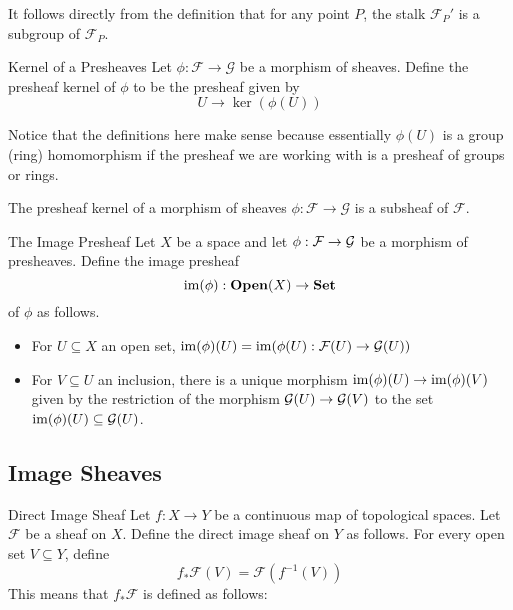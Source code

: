 \documentclass[a4paper]{article}
\begin{document}
It follows directly from the definition that for any point $P$, the stalk $\mathcal{F}_P'$ is a subgroup of $\mathcal{F}_P$. 

\begin{defn}{Kernel of a Presheaves}{} Let $\phi:\mathcal{F}\to\mathcal{G}$ be a morphism of sheaves. Define the presheaf kernel of $\phi$ to be the presheaf given by $$U\to\ker(\phi(U))$$ 
\end{defn}

Notice that the definitions here make sense because essentially $\phi(U)$ is a group (ring) homomorphism if the presheaf we are working with is a presheaf of groups or rings. 

\begin{prp}{}{} The presheaf kernel of a morphism of sheaves $\phi:\mathcal{F}\to\mathcal{G}$ is a subsheaf of $\mathcal{F}$. 
\end{prp}

\begin{defn}{The Image Presheaf}{} Let $X$ be a space and let $\phi:\mathcal{F}\to\mathcal{G}$ be a morphism of presheaves. Define the image presheaf $$\operatorname{im}(\phi):\bold{Open}(X)\to\bold{Set}$$ of $\phi$ as follows. 
\begin{itemize}
\item For $U\subseteq X$ an open set, $\operatorname{im}(\phi)(U)=\operatorname{im}(\phi(U):\mathcal{F}(U)\to\mathcal{G}(U))$
\item For $V\subseteq U$ an inclusion, there is a unique morphism $\operatorname{im}(\phi)(U)\to\operatorname{im}(\phi)(V)$ given by the restriction of the morphism $\mathcal{G}(U)\to\mathcal{G}(V)$ to the set $\operatorname{im}(\phi)(U)\subseteq\mathcal{G}(U)$. 
\end{itemize}
\end{defn}

\subsection{Image Sheaves}
\begin{defn}{Direct Image Sheaf}{} Let $f:X\to Y$ be a continuous map of topological spaces. Let $\mathcal{F}$ be a sheaf on $X$. Define the direct image sheaf on $Y$ as follows. For every open set $V\subseteq Y$, define $$f_\ast\mathcal{F}(V)=\mathcal{F}(f^{-1}(V))$$ This means that $f_\ast\mathcal{F}$ is defined as follows: \\~\\
\end{defn}
\end{document}

